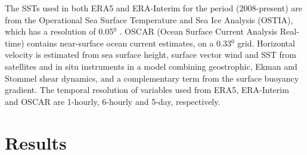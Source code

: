 The SSTs used in both ERA5 and ERA-Interim for the period (2008-present) are from the Operational Sea Surface Temperature and Sea Ice Analysis (OSTIA), which has a resolution of 0.05$^{0}$ \citep{donlon2012operational}. OSCAR (Ocean Surface Current Analysis Real-time) \citep{Bonjean2002} contains near-surface ocean current estimates, on a 0.33$^{0}$ grid. Horizontal velocity is estimated from sea surface height, surface vector wind and SST from satellites and in situ instruments in a model combining geostrophic, Ekman and Stommel shear dynamics, and a complementary term from the surface buoyancy gradient. The temporal resolution of variables used from ERA5, ERA-Interim and OSCAR are 1-hourly, 6-hourly and 5-day, respectively.







\section{Results}

